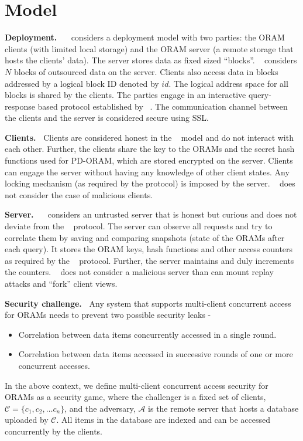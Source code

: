 \section{Model}
\label{model}
\medskip
{\bf Deployment.~} \sysname~ considers a deployment model with two parties: the ORAM clients (with limited 
local storage) and the ORAM server (a remote storage that hosts the clients' data).
The server stores data as fixed sized ``blocks''. \sysname~ considers $N$ 
blocks of outsourced data on the server. Clients also access data in blocks 
addressed by a logical block ID denoted by $id$. 
The logical address space for all blocks is shared by the clients.
The parties engage in an interactive query-response based protocol established 
by \sysname~. The communication channel between the clients and the server is considered 
secure using SSL. 

{\bf Clients.~} Clients are considered honest in the \sysname~ model and 
do not interact with each other. Further, the clients share the key to the ORAMs and 
the secret hash functions used for PD-ORAM, which are stored encrypted on the server. 
Clients can engage the server without having any knowledge of other client states. 
Any locking mechanism (as required by the protocol) is imposed by the server. 
\sysname~ does not consider the case of malicious clients.

{\bf Server.~} \sysname~ considers an untrusted server that is honest but curious and 
does not deviate from the \sysname~ protocol. The server can observe  
all requests and try to correlate them by saving and comparing snapshots (state of the 
ORAMs after each query). It stores the ORAM keys, hash functions and other access counters as 
required by the \sysname~ protocol. Further, the server maintains and duly increments the counters. 
\sysname~ does not consider a malicious server than can mount replay attacks and ``fork'' client views.


{\bf Security challenge.~} Any system that supports multi-client concurrent access for ORAMs needs to prevent two possible security leaks -

\begin{itemize}
 \item Correlation between data items concurrently accessed in a single round.
 \item Correlation between data items accessed in successive rounds of one or more concurrent accesses.
\end{itemize}

In the above context, we define multi-client concurrent access security for ORAMs as a security game, where the challenger is 
a fixed set of clients, $\mathcal{C} = \{ c_1, c_2, \ldots c_n\}$, and the adversary, $\mathcal{A}$ is the remote server that hosts a database 
uploaded by $\mathcal{C}$. All items in the database are indexed and can be accessed concurrently by the clients. 


